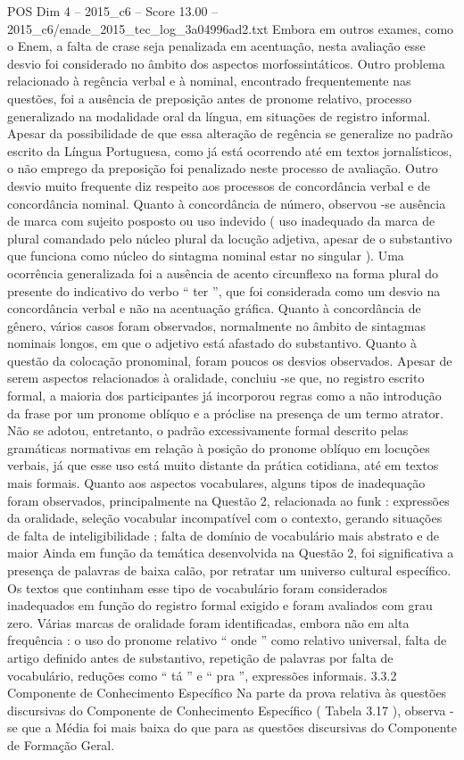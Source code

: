 \begin{textsample}{POS Dim 4 – 2015\_c6 – Score 13.00 – 2015\_c6/enade\_2015\_tec\_log\_3a04996ad2.txt}
Embora em outros exames, como o Enem, a falta de crase seja penalizada em acentuação, nesta avaliação esse desvio foi considerado no âmbito dos aspectos morfossintáticos.
Outro problema relacionado à regência verbal e à nominal, encontrado frequentemente nas questões, foi a ausência de preposição antes de pronome relativo, processo generalizado na modalidade oral da língua, em situações de registro informal.
Apesar da possibilidade de que essa alteração de regência se generalize no padrão escrito da Língua Portuguesa, como já está ocorrendo até em textos jornalísticos, o não emprego da preposição foi penalizado neste processo de avaliação.
Outro desvio muito frequente diz respeito aos processos de concordância verbal e de concordância nominal.
Quanto à concordância de número, observou -se ausência de marca com sujeito posposto ou uso indevido ( uso inadequado da marca de plural comandado pelo núcleo plural da locução adjetiva, apesar de o substantivo que funciona como núcleo do sintagma nominal estar no singular ).
Uma ocorrência generalizada foi a ausência de acento circunflexo na forma plural do presente do indicativo do verbo “ ter ”, que foi considerada como um desvio na concordância verbal e não na acentuação gráfica.
Quanto à concordância de gênero, vários casos foram observados, normalmente no âmbito de sintagmas nominais longos, em que o adjetivo está afastado do substantivo.
Quanto à questão da colocação pronominal, foram poucos os desvios observados.
Apesar de serem aspectos relacionados à oralidade, concluiu -se que, no registro escrito formal, a maioria dos participantes já incorporou regras como a não introdução da frase por um pronome oblíquo e a próclise na presença de um termo atrator.
Não se adotou, entretanto, o padrão excessivamente formal descrito pelas gramáticas normativas em relação à posição do pronome oblíquo em locuções verbais, já que esse uso está muito distante da prática cotidiana, até em textos mais formais.
Quanto aos aspectos vocabulares, alguns tipos de inadequação foram observados, principalmente na Questão 2, relacionada ao funk : expressões da oralidade, seleção vocabular incompatível com o contexto, gerando situações de falta de inteligibilidade ; falta de domínio de vocabulário mais abstrato e de maior Ainda em função da temática desenvolvida na Questão 2, foi significativa a presença de palavras de baixa calão, por retratar um universo cultural específico.
Os textos que continham esse tipo de vocabulário foram considerados inadequados em função do registro formal exigido e foram avaliados com grau zero.
Várias marcas de oralidade foram identificadas, embora não em alta frequência : o uso do pronome relativo “ onde ” como relativo universal, falta de artigo definido antes de substantivo, repetição de palavras por falta de vocabulário, reduções como “ tá ” e “ pra ”, expressões informais. 3.3.2 Componente de Conhecimento Específico Na parte da prova relativa às questões discursivas do Componente de Conhecimento Específico ( Tabela 3.17 ), observa -se que a Média foi mais baixa do que para as questões discursivas do Componente de Formação Geral.

\end{textsample}
